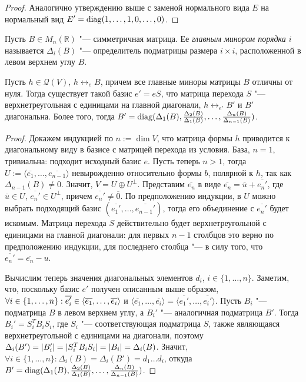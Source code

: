 \begin{proof}
	Аналогично утверждению выше с заменой нормального вида $E$ на нормальный вид $E' = \operatorname{diag}(1, \dotsc, 1, 0, \dotsc, 0)$.
\end{proof}

\begin{definition}
	Пусть $B \in M_n(\mathbb{R})$ "--- симметричная матрица. Ее \textit{главным минором порядка $i$} называется $\Delta_i(B)$ "--- определитель подматрицы размера $i \times i$, расположенной в левом верхнем углу $B$.
\end{definition}

\begin{theorem}
	Пусть $h \in \mathcal{Q}(V)$, $h \leftrightarrow_e B$, причем все главные миноры матрицы $B$ отличны от нуля. Тогда существует такой базис $e' = eS$, что матрица перехода $S$ "--- верхнетреугольная с единицами на главной диагонали, $h \leftrightarrow_{e'} B'$ и $B'$ диагональна. Более того, тогда $B' = \operatorname{diag}(\Delta_1(B), \frac{\Delta_2(B)}{\Delta_1(B)}, \dotsc, \frac{\Delta_{n}(B)}{\Delta_{n-1}(B)})$.
\end{theorem}

\begin{proof}
	Докажем индукцией по $n := \dim{V}$, что матрица формы $h$ приводится к диагональному виду в базисе с матрицей перехода из условия. База, $n = 1$, тривиальна: подходит исходный базис $e$. Пусть теперь $n > 1$, тогда $U := \langle\overline{e_1}, \dots, \overline{e_{n - 1}}\rangle$ невырожденно относительно формы $b$, полярной к $h$, так как $\Delta_{n - 1}(B) \ne 0$. Значит, $V = U \oplus U^\perp$. Представим $\overline{e_n}$ в виде $\overline{e_n} = \overline{u} + \overline{e_n'}$, где $\overline{u} \in U$, $\overline{e_n'} \in U^\perp$, причем $\overline{e_n'} \ne \overline{0}$. По предположению индукции, в $U$ можно выбрать подходящий базис $(\overline{e_1'}, \dots, \overline{e_{n-1}'})$, тогда его объединение с $\overline{e_n'}$ будет искомым. Матрица перехода $S$ действительно будет верхнетреугольной с единицами на главной диагонали: для первых $n - 1$ столбцов это верно по предположению индукции, для последнего столбца "--- в силу того, что $\overline{e_n'} = \overline{e_n} - u$.
	
	Вычислим теперь значения диагональных элементов $d_i$, $i \in \{1, \dotsc, n\}$. Заметим, что, поскольку базис $e'$ получен описанным выше образом, $\forall i \in \{1, \dots, n\}: \overline{e_i'} \hm{\in} \langle\overline{e_1}, \dots, \overline{e_i}\rangle$ и $\langle\overline{e_1}, \dots, \overline{e_i}\rangle = \langle\overline{e_1'}, \dots, \overline{e_i'}\rangle$. Пусть $B_i$ "--- подматрица $B$ в левом верхнем углу, а $B_i'$ "--- аналогичная подматрица $B'$. Тогда $B_i' = S_i^TB_iS_i$, где $S_i$ "--- соответствующая подматрица $S$, также являющаяся верхнетреугольной с единицами на диагонали, поэтому $\Delta_i(B') = |B_i'|\hm{=}|S_i^TB_iS_i| \hm{=} |B_i| = \Delta_i(B)$. Значит, $\forall i \in \{1, \dotsc, n\}: \Delta_i(B) = \Delta_i(B') = d_1\dots d_i$, откуда $B' = \operatorname{diag}(\Delta_1(B), \frac{\Delta_2(B)}{\Delta_1(B)}, \dotsc, \frac{\Delta_{n}(B)}{\Delta_{n-1}(B)})$.
\end{proof}

